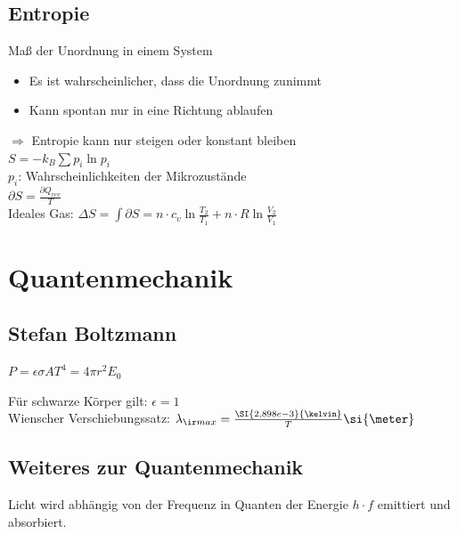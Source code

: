 \documentclass[german]{latex4ei/latex4ei_sheet}
\begin{document}
\subsection{Entropie}
Maß der Unordnung in einem System
\begin{itemize}
	\item Es ist wahrscheinlicher, dass die Unordnung zunimmt
	\item Kann spontan nur in eine Richtung ablaufen
\end{itemize}
$\Rightarrow$ Entropie kann nur steigen oder konstant bleiben\\
$S=-k_B\sum p_i \ln p_i$ \\ 
$p_i$: Wahrscheinlichkeiten der Mikrozustände\\
$\partial S = \frac{\partial Q_{rev}}{T}$\\
Ideales Gas: $\Delta S= \int \partial S = n \cdot c_v \ln \frac{T_2}{T_1}+n\cdot R \ln \frac{V_2}{V_1}$



\section{Quantenmechanik}
\subsection{Stefan Boltzmann}
\begin{emphbox}
$P=\epsilon \sigma A T^4 = 4 \pi r^2 E_0$
\end{emphbox}
Für schwarze Körper gilt: $\epsilon = 1$\\
Wienscher Verschiebungssatz: $\lambda_{\ir max}=\frac{\SI{2,898e-3}{\kelvin}}{T} \si{\meter}$
\subsection{Weiteres zur Quantenmechanik}
Licht wird abhängig von der Frequenz in Quanten der Energie $h\cdot f$ emittiert und absorbiert.
\end{document}

